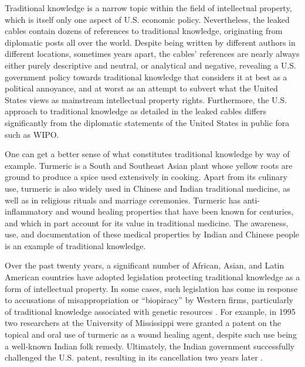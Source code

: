 \documentclass[12pt]{article}
\begin{document}
Traditional knowledge is a narrow topic within the field of intellectual property, which is itself 
only one aspect of U.S. economic policy. Nevertheless, the leaked cables contain dozens of references 
to traditional knowledge, originating from diplomatic posts all over the world. Despite being written 
by different authors in different locations, sometimes years apart, the cables' references are nearly 
always either purely descriptive and neutral, or analytical and negative, revealing a U.S. government 
policy towards traditional knowledge that considers it at best as a political annoyance, and at worst as 
an attempt to subvert what the United States views as mainstream intellectual property rights. Furthermore, the U.S. 
approach to traditional knowledge as detailed in the leaked cables differs significantly from the 
diplomatic statements of the United States in public fora such as WIPO.

One can get a better sense of what constitutes traditional knowledge by way of example. Turmeric is 
a South and Southeast Asian plant whose yellow roots are ground to produce a spice used extensively 
in cooking. Apart from its culinary use, turmeric is also widely used in Chinese and Indian 
traditional medicine, as well as in religious rituals and marriage ceremonies. Turmeric has 
anti-inflammatory and wound healing properties that have been known for centuries, and which in part 
account for its value in traditional medicine. The awareness, use, and documentation of these medical 
properties by Indian and Chinese people is an example of traditional knowledge.

Over the past twenty years, a significant number of African, Asian, and Latin American countries have 
adopted legislation protecting traditional knowledge as a form of intellectual property. In some cases, 
such legislation has come in response to accusations of misappropriation or ``biopiracy'' by Western 
firms, particularly of traditional knowledge associated with genetic 
resources \citep{dagne2012protection}. For example, in 1995 two researchers at the University of Mississippi 
were granted a patent on the topical and oral use of turmeric as a wound healing agent, despite such 
use being a well-known Indian folk remedy. Ultimately, the Indian government successfully challenged the 
U.S. patent, resulting in its cancellation two years later \citep{kumar1997india}.
\end{document}
